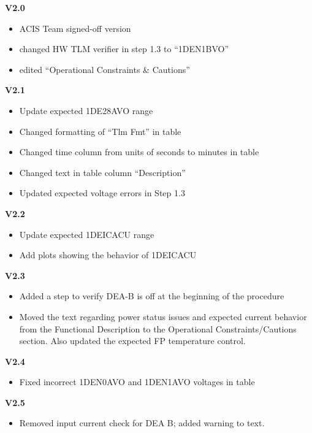 \documentclass[11pt]{article}
\begin{document}
{\bf V2.0}
\begin{itemize}
\item ACIS Team signed-off version
\item changed HW TLM verifier in step 1.3 to ``1DEN1BVO''
\item edited ``Operational Constraints \& Cautions''
\end{itemize}

{\bf V2.1}
\begin{itemize}
\item Update expected 1DE28AVO range
\item Changed formatting of ``Tlm Fmt'' in table
\item Changed time column from units of seconds to minutes in table
\item Changed text in table column ``Description''
\item Updated expected voltage errors in Step 1.3
\end{itemize}

{\bf V2.2}
\begin{itemize}
\item Update expected 1DEICACU range
\item Add plots showing the behavior of 1DEICACU
\end{itemize}

{\bf V2.3}
\begin{itemize}
\item Added a step to verify DEA-B is off at the beginning of the procedure
\item Moved the text regarding power status issues and expected current behavior from the Functional Description to the Operational Constraints/Cautions section. Also updated the expected FP temperature control.
\end{itemize}

{\bf V2.4}
\begin{itemize}
\item Fixed incorrect 1DEN0AVO and 1DEN1AVO voltages in table
\end{itemize}

{\bf V2.5}
\begin{itemize}
\item Removed input current check for DEA B; added warning to text.
\end{itemize}
\end{document}
